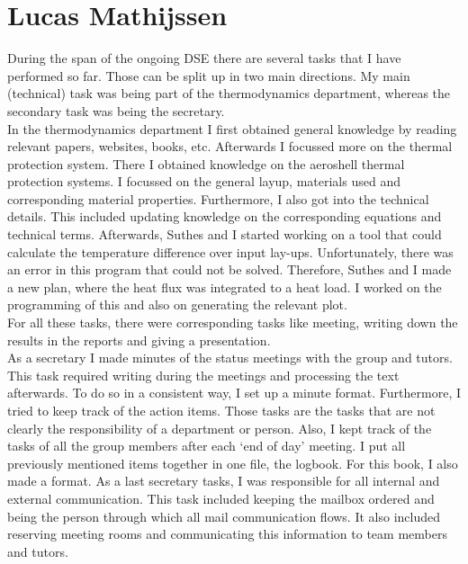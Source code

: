 \section{Lucas Mathijssen}
During the span of the ongoing DSE there are several tasks that I have performed so far. Those can be split up in two main directions. My main (technical) task was being part of the thermodynamics department, whereas the secondary task was being the secretary. \\

In the thermodynamics department I first obtained general knowledge by reading relevant papers, websites, books, etc. Afterwards I focussed more on the thermal protection system. There I obtained knowledge on the aeroshell thermal protection systems. I focussed on the general layup, materials used and corresponding material properties. Furthermore, I also got into the technical details. This included updating knowledge on the corresponding equations and technical terms. Afterwards, Suthes and I started working on a tool that could calculate the temperature difference over input lay-ups. Unfortunately, there was an error in this program that could not be solved. Therefore, Suthes and I made a new plan, where the heat flux was integrated to a heat load. I worked on the programming of this and also on generating the relevant plot. \\

For all these tasks, there were corresponding tasks like meeting, writing down the results in the reports and giving a presentation. \\

As a secretary I made minutes of the status meetings with the group and tutors. This task required writing during the meetings and processing the text afterwards. To do so in a consistent way, I set up a minute format. Furthermore, I tried to keep track of the action items. Those tasks are the tasks that are not clearly the responsibility of a department or person.  Also, I kept track of the tasks of all the group members after each ‘end of day’ meeting. I put all previously mentioned items together in one file, the logbook. For this book, I also made a format. As a last secretary tasks, I was responsible for all internal and external communication. This task included keeping the mailbox ordered and being the person through which all mail communication flows. It also included reserving meeting rooms and communicating this information to team members and tutors.\\

